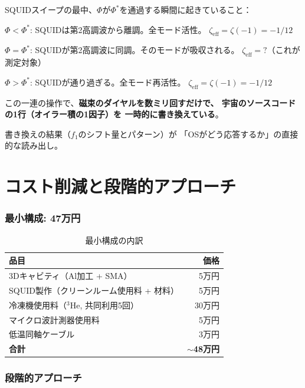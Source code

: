 \documentclass[12pt,a4paper]{article}
\begin{document}
\begin{insightbox}
SQUIDスイープの最中、$\Phi$が$\Phi^*$を通過する瞬間に起きていること：

$\Phi < \Phi^*$: SQUIDは第2高調波から離調。全モード活性。
$\zeta_{\mathrm{eff}} = \zeta(-1) = -1/12$

$\Phi = \Phi^*$: SQUIDが第2高調波に同調。そのモードが吸収される。
$\zeta_{\mathrm{eff}} = ?$（これが測定対象）

$\Phi > \Phi^*$: SQUIDが通り過ぎる。全モード再活性。
$\zeta_{\mathrm{eff}} = \zeta(-1) = -1/12$

この一連の操作で、\textbf{磁束のダイヤルを数ミリ回すだけで、
宇宙のソースコードの1行（オイラー積の1因子）を
一時的に書き換えている}。

書き換えの結果（$f_1$のシフト量とパターン）が
「OSがどう応答するか」の直接的な読み出し。
\end{insightbox}

\part{コスト削減と段階的アプローチ}

\section{最小構成: 47万円}

\begin{table}[h]
\centering
\caption{最小構成の内訳}
\begin{tabular}{lr}
\toprule
品目 & 価格 \\
\midrule
3Dキャビティ（Al加工 + SMA） & 5万円 \\
SQUID製作（クリーンルーム使用料 + 材料） & 5万円 \\
冷凍機使用料（$^3$He, 共同利用5回） & 30万円 \\
マイクロ波計測器使用料 & 5万円 \\
低温同軸ケーブル & 3万円 \\
\midrule
\textbf{合計} & \textbf{$\sim$48万円} \\
\bottomrule
\end{tabular}
\end{table}

\section{段階的アプローチ}
\end{document}
